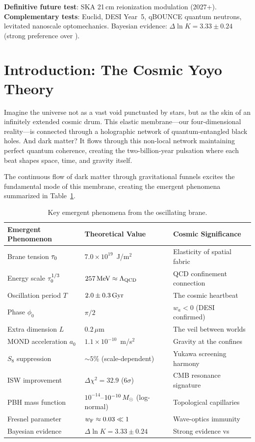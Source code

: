 \textbf{Definitive future test}: SKA 21\,cm reionization modulation (2027+). \textbf{Complementary tests}: Euclid, DESI Year~5, qBOUNCE quantum neutrons, levitated nanoscale optomechanics. Bayesian evidence: $\Delta\ln K = 3.33 \pm 0.24$ (strong preference over \LCDM).

\newpage

\chapter*{Introduction: The Cosmic Yoyo Theory}

Imagine the universe not as a vast void punctuated by stars, but as the skin of an infinitely extended cosmic drum. This elastic membrane---our four-dimensional reality---is connected through a holographic network of quantum-entangled black holes. And dark matter? It flows through this non-local network maintaining perfect quantum coherence, creating the two-billion-year pulsation where each beat shapes space, time, and gravity itself.

The continuous flow of dark matter through gravitational funnels excites the fundamental mode of this membrane, creating the emergent phenomena summarized in Table~\ref{tab:key_predictions}.

\begin{table}[h]
\centering
\caption{Key emergent phenomena from the oscillating brane.}
\label{tab:key_predictions}
\begin{tabular}{@{}lll@{}}
\toprule
\textbf{Emergent Phenomenon} & \textbf{Theoretical Value} & \textbf{Cosmic Significance} \\
\midrule
Brane tension $\tau_0$ & $7.0 \times 10^{19}$~J/m$^2$ & Elasticity of spatial fabric \\
Energy scale $\tau_0^{1/3}$ & $257\,\text{MeV} \approx \Lambda_\text{QCD}$ & QCD confinement connection \\
Oscillation period $T$ & $2.0 \pm 0.3\,\text{Gyr}$ & The cosmic heartbeat \\
Phase $\phi_0$ & $\pi/2$ & $w_a < 0$ (DESI confirmed) \\
Extra dimension $L$ & $0.2\,\mu$m & The veil between worlds \\
MOND acceleration $a_0$ & $1.1 \times 10^{-10}$~m/s$^2$ & Gravity at the confines \\
$S_8$ suppression & $\sim 5\%$ (scale-dependent) & Yukawa screening harmony \\
ISW improvement & $\Delta\chi^2 = 32.9$ ($6\sigma$) & CMB resonance signature \\
PBH mass function & $10^{-14}$--$10^{-10}\,M_\odot$ (log-normal) & Topological capillaries \\
Fresnel parameter & $w_\text{F} \approx 0.03 \ll 1$ & Wave-optics immunity \\
Bayesian evidence & $\Delta\ln K = 3.33 \pm 0.24$ & Strong evidence vs \LCDM{} \\
\bottomrule
\end{tabular}
\end{table}

